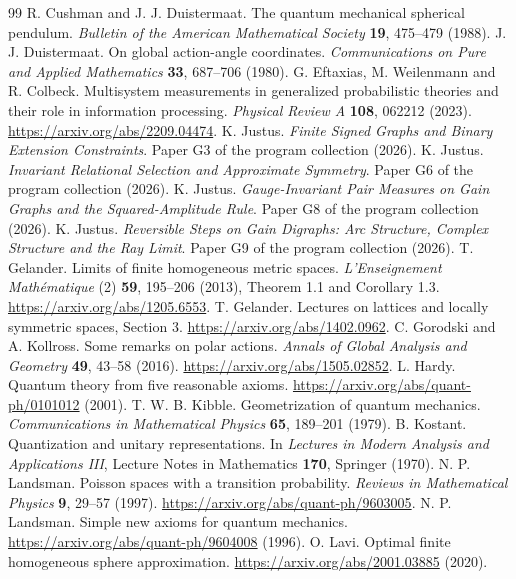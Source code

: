 \documentclass[11pt,a4paper]{article}
\begin{document}
\begin{thebibliography}{99}
 R. Cushman and J. J. Duistermaat. The quantum mechanical spherical pendulum. \emph{Bulletin of the American Mathematical Society} \textbf{19}, 475--479 (1988).
 J. J. Duistermaat. On global action-angle coordinates. \emph{Communications on Pure and Applied Mathematics} \textbf{33}, 687--706 (1980).
 G. Eftaxias, M. Weilenmann and R. Colbeck. Multisystem measurements in generalized probabilistic theories and their role in information processing. \emph{Physical Review A} \textbf{108}, 062212 (2023). \url{https://arxiv.org/abs/2209.04474}.
 K. Justus. \emph{Finite Signed Graphs and Binary Extension Constraints}. Paper G3 of the program collection (2026).
 K. Justus. \emph{Invariant Relational Selection and Approximate Symmetry}. Paper G6 of the program collection (2026).
 K. Justus. \emph{Gauge-Invariant Pair Measures on Gain Graphs and the Squared-Amplitude Rule}. Paper G8 of the program collection (2026).
 K. Justus. \emph{Reversible Steps on Gain Digraphs: Arc Structure, Complex Structure and the Ray Limit}. Paper G9 of the program collection (2026).
 T. Gelander. Limits of finite homogeneous metric spaces. \emph{L'Enseignement Math\'ematique} (2) \textbf{59}, 195--206 (2013), Theorem 1.1 and Corollary 1.3. \url{https://arxiv.org/abs/1205.6553}.
 T. Gelander. Lectures on lattices and locally symmetric spaces, Section 3. \url{https://arxiv.org/abs/1402.0962}.
 C. Gorodski and A. Kollross. Some remarks on polar actions. \emph{Annals of Global Analysis and Geometry} \textbf{49}, 43--58 (2016). \url{https://arxiv.org/abs/1505.02852}.
 L. Hardy. Quantum theory from five reasonable axioms. \url{https://arxiv.org/abs/quant-ph/0101012} (2001).
 T. W. B. Kibble. Geometrization of quantum mechanics. \emph{Communications in Mathematical Physics} \textbf{65}, 189--201 (1979).
 B. Kostant. Quantization and unitary representations. In \emph{Lectures in Modern Analysis and Applications III}, Lecture Notes in Mathematics \textbf{170}, Springer (1970).
 N. P. Landsman. Poisson spaces with a transition probability. \emph{Reviews in Mathematical Physics} \textbf{9}, 29--57 (1997). \url{https://arxiv.org/abs/quant-ph/9603005}.
 N. P. Landsman. Simple new axioms for quantum mechanics. \url{https://arxiv.org/abs/quant-ph/9604008} (1996).
 O. Lavi. Optimal finite homogeneous sphere approximation. \url{https://arxiv.org/abs/2001.03885} (2020).

\end{thebibliography}
\end{document}
